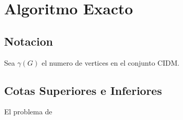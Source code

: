 \section{Algoritmo Exacto}

\subsection{Notacion}

Sea $\gamma(G)$ el numero de vertices en el conjunto CIDM.

\subsection{Cotas Superiores e Inferiores}

El problema de